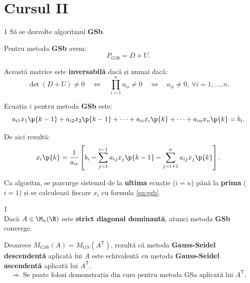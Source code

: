 
\section*{Cursul II}

\begin{exercitiu}{1}
    Să se dezvolte algoritmul \textbf{GSb}. 
\end{exercitiu}

\begin{demonstratie}
    Pentru metoda \textbf{GSb} avem:
    $$
    P_{GSb} = D + U.
    $$

    Această matrice este \textbf{inversabilă} dacă și numai dacă:
    $$
    \det(D + U) \neq 0
    \quad \Longleftrightarrow \quad
    \prod_{i=1}^{n} a_{ii} \neq 0
    \quad \Longleftrightarrow \quad
    a_{ii} \neq 0, \ \forall i = 1, \dots, n.
    $$

    \vspace{1em}
    Ecuația $i$ pentru metoda \textbf{GSb} este:
    $$
    a_{i1}x_1\p{k-1} + a_{i2}x_2\p{k-1} + \dots + a_{ii}x_i\p{k} + \dots + a_{in}x_n\p{k} = b_i.
    $$

    De aici rezultă:
    \begin{equation}
    x_i\p{k} = \frac{1}{a_{ii}} 
    \left[
    b_i - 
    \sum_{j=1}^{i-1} a_{ij} x_j\p{k-1} -
    \sum_{j=i+1}^{n} a_{ij} x_j\p{k}
    \right].
    \label{eq:gsb}
    \end{equation}

    Ca algoritm, se parcurge sistemul de la \textbf{ultima} ecuație ($i = n$) până la \textbf{prima} ($i = 1$) și se calculează fiecare $x_i$ cu formula \eqref{eq:gsb}.
\end{demonstratie}

\vspace{2em}
\begin{teorema}{1}
    \text{ }\\[0.5em]
    Dacă $A \in \M_n(\R)$ este \textbf{strict diagonal dominantă}, atunci metoda \textbf{GSb} converge.
\end{teorema}

\begin{demonstratie} 
    \begin{observatie}
    Deoarece $M_{GSb}(A) = M_{GS}(A^{\mathsf T})$, rezultă că metoda \textbf{Gauss-Seidel descendentă} aplicată lui $A$ este echivalentă cu metoda \textbf{Gauss-Seidel ascendentă} aplicată lui $A^{\mathsf T}$.
    $$
    \Rightarrow\ \text{Se poate folosi demonstrația din curs pentru metoda GSa aplicată lui } A^{\mathsf T}.
    $$
    \end{observatie}
\end{demonstratie}

